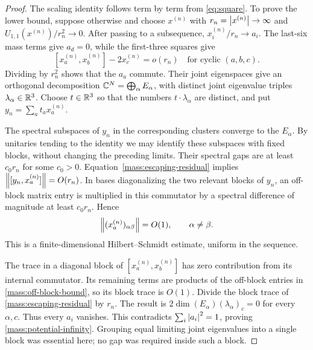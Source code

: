 \begin{proof}
The scaling identity follows term by term from
\eqref{eq:square}. To prove the lower bound, suppose otherwise and
choose \(x^{(n)}\) with \(r_n=\left\lvert x^{(n)}\right\rvert\to\infty\) and
\(U_{1,1}(x^{(n)})/r_n^2\to0\). After passing to a subsequence,
\(x_i^{(n)}/r_n\to a_i\). The last-six mass terms give \(a_d=0\),
while the first-three squares give
\begin{equation}
\label{mass:escaping-residual}
 [x_a^{(n)},x_b^{(n)}]-2x_c^{(n)}=o(r_n)
 \quad\text{for cyclic }(a,b,c).
\end{equation}
Dividing by \(r_n^2\) shows that the \(a_a\) commute. Their joint
eigenspaces give an orthogonal decomposition
\(\mathbb C^N=\bigoplus_\alpha E_\alpha\), with distinct joint eigenvalue
triples \(\lambda_\alpha\in\mathbb R^3\). Choose \(t\in\mathbb R^3\) so that
the numbers \(t\cdot\lambda_\alpha\) are distinct, and put
\(y_n=\sum_a t_ax_a^{(n)}\).

The spectral subspaces of \(y_n\) in the corresponding clusters
converge to the \(E_\alpha\). By unitaries tending to the identity
we may identify these subspaces with fixed blocks, without changing
the preceding limits. Their spectral gaps are at least \(c_0r_n\)
for some \(c_0>0\). Equation~\eqref{mass:escaping-residual} implies
\(\left\lVert [y_n,x_a^{(n)}]\right\rVert=O(r_n)\). In bases diagonalizing the two
relevant blocks of \(y_n\), an off-block matrix entry is multiplied
in this commutator by a spectral difference of magnitude at least
\(c_0r_n\). Hence
\begin{equation}
\label{mass:off-block-bound}
 \left\lVert (x_a^{(n)})_{\alpha\beta}\right\rVert=O(1),\qquad\alpha\ne\beta.
\end{equation}
This is a finite-dimensional Hilbert--Schmidt estimate, uniform in
the sequence.

The trace in a diagonal block of \([x_a^{(n)},x_b^{(n)}]\) has zero
contribution from its internal commutator. Its remaining terms are
products of the off-block entries in \eqref{mass:off-block-bound},
so its block trace is \(O(1)\). Divide the block trace of
\eqref{mass:escaping-residual} by \(r_n\). The result is
\(2\dim(E_\alpha)(\lambda_\alpha)_c=0\) for every \(\alpha,c\).
Thus every \(a_i\) vanishes. This contradicts
\(\sum_i\left\lvert a_i\right\rvert^2=1\), proving \eqref{mass:potential-infinity}.
Grouping equal limiting joint eigenvalues into a single block was
essential here; no gap was required inside such a block.
\end{proof}

